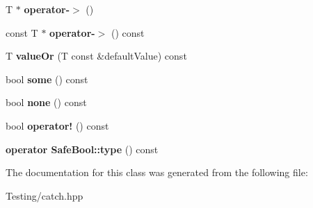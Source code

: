 \begin{DoxyCompactItemize}
\item 
\hypertarget{class_catch_1_1_option_acad340798a16c8f700f8763119e90f31}{T $\ast$ {\bfseries operator-\/$>$} ()}\label{class_catch_1_1_option_acad340798a16c8f700f8763119e90f31}

\item 
\hypertarget{class_catch_1_1_option_a0800340b2971748671b88acfb14bb928}{const T $\ast$ {\bfseries operator-\/$>$} () const }\label{class_catch_1_1_option_a0800340b2971748671b88acfb14bb928}

\item 
\hypertarget{class_catch_1_1_option_a21b5629a7febbe3e23c475c9d9138a2d}{T {\bfseries value\-Or} (T const \&default\-Value) const }\label{class_catch_1_1_option_a21b5629a7febbe3e23c475c9d9138a2d}

\item 
\hypertarget{class_catch_1_1_option_affa96f15798b4656fb753ff52d12dec2}{bool {\bfseries some} () const }\label{class_catch_1_1_option_affa96f15798b4656fb753ff52d12dec2}

\item 
\hypertarget{class_catch_1_1_option_a389324d2aa20ceb0eb0f48a5f77c20c8}{bool {\bfseries none} () const }\label{class_catch_1_1_option_a389324d2aa20ceb0eb0f48a5f77c20c8}

\item 
\hypertarget{class_catch_1_1_option_a47a1b6f6def2730ea9d27a1860a4f97f}{bool {\bfseries operator!} () const }\label{class_catch_1_1_option_a47a1b6f6def2730ea9d27a1860a4f97f}

\item 
\hypertarget{class_catch_1_1_option_a637d4366ae7f0ded52ce59c8cb06da7b}{{\bfseries operator Safe\-Bool\-::type} () const }\label{class_catch_1_1_option_a637d4366ae7f0ded52ce59c8cb06da7b}

\end{DoxyCompactItemize}


The documentation for this class was generated from the following file\-:\begin{DoxyCompactItemize}
\item 
Testing/catch.\-hpp\end{DoxyCompactItemize}
